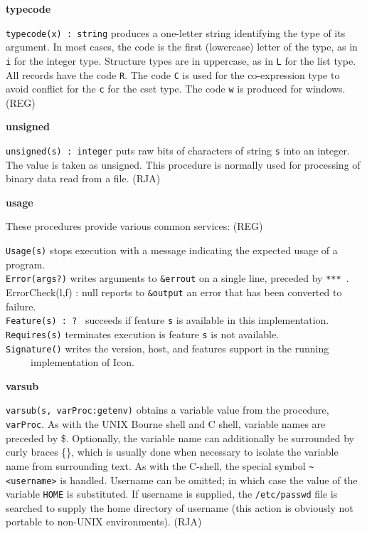 {\sffamily\bfseries
typecode}

\texttt{typecode(x) : string} produces a one-letter string identifying
the type of its argument. In most cases, the code is the first
(lowercase) letter of the type, as in
\texttt{{\textquotedbl}i{\textquotedbl}} for the integer type.
Structure types are in uppercase, as in
\texttt{{\textquotedbl}L{\textquotedbl}} for the list type. All records
have the code \texttt{{\textquotedbl}R{\textquotedbl}}. The code
\texttt{{\textquotedbl}C{\textquotedbl}} is used for the co-expression
type to avoid conflict for the \texttt{{\textquotedbl}c{\textquotedbl}}
for the cset type. The code \texttt{{\textquotedbl}w{\textquotedbl}} is
produced for windows. (REG)

{\sffamily\bfseries
unsigned}

\texttt{unsigned(s) : integer} puts raw bits of characters of string
\texttt{s} into an integer. The value is taken as unsigned. This
procedure is normally used for processing of binary data read from a
file. (RJA)

{\sffamily\bfseries
usage}

These procedures provide various common services: (REG)

\texttt{Usage(s)} stops execution with a message
indicating the expected usage of a program.\\
\texttt{Error(args?)} writes arguments to \texttt{\&errout} on a single
line, preceded by \texttt{{\textquotedbl}*** {\textquotedbl}}.\\
\textsf{ErrorCheck(l,f) : null} reports to \texttt{\&output} an error
that has been converted to failure.\\
\texttt{Feature(s)}\texttt{ : ?} \ succeeds if feature
\texttt{s} is available in this implementation.\\
\texttt{Requires(s)} terminates execution is feature \texttt{s} is not
available.\\
\texttt{Signature()} writes the version, host, and features support in
the running\\
 \ \ \ \ \ implementation of Icon. 

{\sffamily\bfseries
varsub}

\texttt{varsub(s, varProc:getenv)} obtains a variable value from the
procedure, \texttt{varProc}. As with the UNIX Bourne shell and C shell,
variable names are preceded by \$. Optionally, the variable name can
additionally be surrounded by curly braces \{\}, which is usually done
when necessary to isolate the variable name from surrounding text. As
with the C-shell, the special symbol
\texttt{\~{}{\textless}username{\textgreater}} is handled. Username can
be omitted; in which case the value of the variable \texttt{HOME} is
substituted. If username is supplied, the \texttt{/etc/passwd} file is
searched to supply the home directory of username (this action is
obviously not portable to non-UNIX environments). (RJA)

